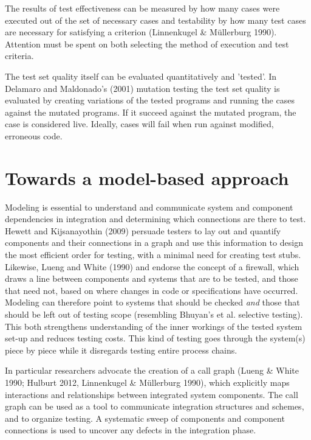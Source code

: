 \documentclass[12pt,a4paper,oneside,pdftex]{report}
\begin{document}
The results of test effectiveness can be measured by how many cases were executed out of the set of necessary cases and testability by how many test cases are necessary for satisfying a criterion (Linnenkugel \& Müllerburg 1990). Attention must be spent on both selecting the method of execution and test criteria. 

The test set quality itself can be evaluated quantitatively and 'tested'. In Delamaro and Maldonado's (2001) mutation testing the test set quality is evaluated by creating variations of the tested programs and running the cases against the mutated programs. If it succeed against the mutated program, the case is considered live. Ideally, cases will fail when run against modified, erroneous code.

\section{Towards a model-based approach}

Modeling is essential to understand and communicate system and component dependencies in 
integration and determining which connections are there to test. Hewett and Kijsanayothin (2009) persuade testers to lay out and quantify components and their connections in a graph and use this information to design the 
most efficient order for testing, with a minimal need for creating test stubs. Likewise, Lueng and White (1990) and \citet{abdullah1995correcting} endorse the concept of a firewall, which draws a line between 
components and systems that are to be tested, and those that need not, based on where changes 
in code or specifications have occurred. Modeling can therefore point to systems that should 
be checked \textit{and} those that should be left out of testing scope (resembling Bhuyan's et al. selective testing). This both strengthens understanding of the inner workings of the tested system set-up and reduces testing costs. 
This kind of testing goes through the system(s) piece by piece while it disregards testing entire process chains.
 
In particular researchers advocate the creation of a call graph (Lueng \& White 1990; Hulburt 2012, Linnenkugel \& Müllerburg 1990), which explicitly maps interactions and relationships between integrated system components. The call graph can be used as a tool to communicate integration structures and schemes, and to organize testing. A systematic sweep of components and component connections is used to uncover any defects in the integration phase. 
\end{document}
